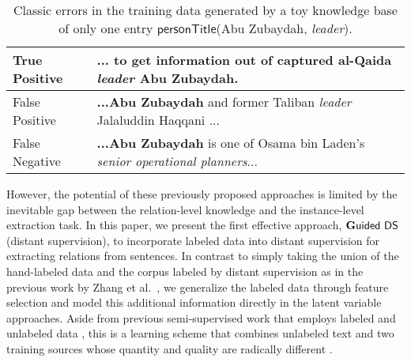 \documentclass[11pt]{article}
\begin{document}
\captionsetup{belowskip=-14pt,aboveskip=-5pt}
\begin{table}[ht]
\small
\begin{center}
\begin{tabular}{ p{.8in}|p{1.9in} }
\hline
True Positive & ... to get information out of captured al-Qaida \textit{leader} {\textbf{Abu Zubaydah}}.\\
\hline
False Positive & {\textbf{...Abu Zubaydah}} and former Taliban \textit{leader} Jalaluddin Haqqani ... \\
\hline
False Negative & \textbf{...Abu Zubaydah} is one of Osama bin Laden's \textit{senior operational planners}...\\
\hline
\end{tabular}
\end{center}
\caption{Classic errors in the training data generated by a toy knowledge base of only one entry 
$\mathsf{personTitle}$(Abu Zubaydah, \textit{leader}).}
\label{example_motivation}
\end{table}

However, the potential of these previously proposed approaches is limited by the inevitable gap between the relation-level knowledge and the instance-level 
extraction task. In this paper, we present the first effective approach, $\mathsf{{\bf G}uided\ DS}$ (distant supervision), to incorporate labeled data into distant 
supervision for extracting relations from sentences. In contrast to simply taking the union of the hand-labeled data and the corpus labeled by 
distant supervision as in the previous work by Zhang et al.~, we generalize the labeled data through feature selection and 
model this additional information directly in the latent variable approaches. Aside from previous semi-supervised work that employs labeled and unlabeled data \cite[and others]{yarowsky1995unsupervised,blum98,collins1999unsupervised,nigam2001using}, this is a learning scheme that combines unlabeled text and two training sources whose quantity and quality are radically different \cite{liang09}.

\end{document}
